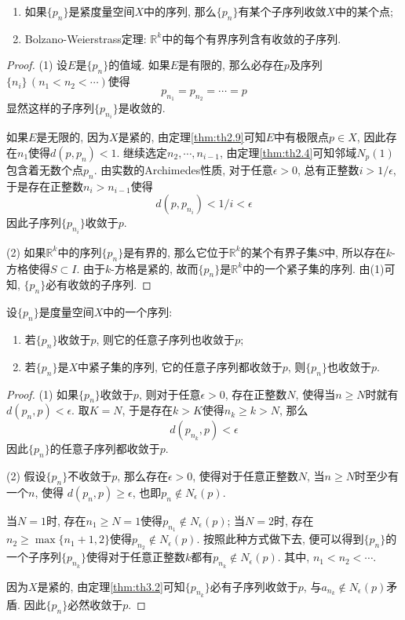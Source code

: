 \documentclass[cn,12pt,math=mtpro2,citestyle=gb7714-2015,bibstyle=gb7714-2015,twocol]{elegantbook}
\newcommand{\R}{\mathbb{R}}
\begin{document}
\begin{theorem}\label{thm:th3.2}
  \begin{enumerate}[label=(\arabic*)]
  \item 如果$\{p_n\}$是紧度量空间$X$中的序列, 那么$\{p_n\}$有某个子序列收敛$X$中的某个点;

  \item Bolzano-Weierstrass定理: $\R^k$中的每个有界序列含有收敛的子序列.
  \end{enumerate}
\end{theorem}
\begin{proof}
  (1) 设$E$是$\{p_n\}$的值域. 如果$E$是有限的, 那么必存在$p$及序列$\{n_i\}\,(n_1<n_2<\cdots)$使得
  $$p_{n_1}=p_{n_2}=\cdots=p$$
  显然这样的子序列$\{p_{n_i}\}$是收敛的.

  如果$E$是无限的, 因为$X$是紧的, 由定理\ref{thm:th2.9}可知$E$中有极限点$p\in X$, 因此存在$n_1$使得$d(p,p_n)<1$. 继续选定$n_2,\cdots,n_{i-1}$, 由定理\ref{thm:th2.4}可知邻域$N_p(1)$包含着无数个点$p_n$. 由实数的Archimedes性质, 对于任意$\epsilon>0$, 总有正整数$ i>1/\epsilon$, 于是存在正整数$n_i>n_{i-1}$使得
  $$\displaystyle d(p,p_{n_i})<1/i <\epsilon$$
   因此子序列$\{p_{n_i}\}$收敛于$p$.

   (2) 如果$\R^k$中的序列$\{p_n\}$是有界的, 那么它位于$\R^k$的某个有界子集$S$中, 所以存在$k$-方格使得$S\subset I$.  由于$k$-方格是紧的, 故而$\{p_n\}$是$\R^k$中的一个紧子集的序列. 由(1)可知, $\{p_n\}$必有收敛的子序列.

\end{proof}
\begin{theorem}\label{thm:th3.7}
  设$\{p_n\}$是度量空间$X$中的一个序列:
  \begin{enumerate}[label=(\arabic*)]
  \item 若$\{p_n\}$收敛于$p$, 则它的任意子序列也收敛于$p$;

  \item 若$\{p_n\}$是$X$中紧子集的序列, 它的任意子序列都收敛于$p$, 则$\{p_n\}$也收敛于$p$.
  \end{enumerate}
\end{theorem}
\begin{proof}
  (1) 如果$\{p_n\}$收敛于$p$, 则对于任意$\epsilon>0$, 存在正整数$N$, 使得当$n\geq N$时就有
  $d(p_n,p)<\epsilon$. 取$K=N$, 于是存在$k>K$使得$n_k\geq k>N$, 那么
  $$d(p_{n_k},p)<\epsilon$$
  因此$\{p_n\}$的任意子序列都收敛于$p$.

  (2)  假设$\{p_n\}$不收敛于$p$, 那么存在$\epsilon>0$, 使得对于任意正整数$N$, 当$n\geq N$时至少有一个$n$, 使得
  $d(p_n,p)\geq\epsilon$, 也即$p_n\notin N_{\epsilon}(p)$.

  当$N=1$时, 存在$n_1\geq N=1$使得$p_{n_1}\notin N_\epsilon(p)$; 当$N=2$时, 存在$n_2\geq\max\{n_1+1,2\}$使得$p_{n_2}\notin N_{\epsilon}(p)$. 按照此种方式做下去, 便可以得到$\{p_{n}\}$的一个子序列$\{p_{n_k}\}$使得对于任意正整数$k$都有$p_{n_k}\notin N_\epsilon(p)$. 其中, $n_1<n_2<\cdots$.

  因为$X$是紧的, 由定理\ref{thm:th3.2}可知$\{p_{n_k}\}$必有子序列收敛于$p$, 与$a_{n_k}\notin N_\epsilon(p) $矛盾. 因此$\{p_n\}$必然收敛于$p$.
\end{proof}
\end{document}
